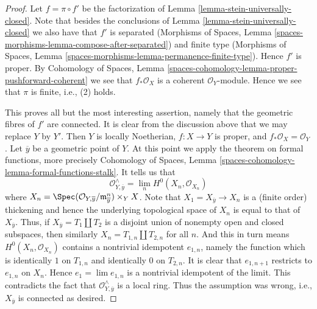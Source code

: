 \begin{proof}
Let $f = \pi \circ f'$ be the factorization of
Lemma \ref{lemma-stein-universally-closed}. Note that besides the
conclusions of Lemma \ref{lemma-stein-universally-closed} we
also have that $f'$ is separated
(Morphisms of Spaces, Lemma
\ref{spaces-morphisms-lemma-compose-after-separated})
and finite type
(Morphisms of Spaces, Lemma
\ref{spaces-morphisms-lemma-permanence-finite-type}).
Hence $f'$ is proper. By
Cohomology of Spaces, Lemma
\ref{spaces-cohomology-lemma-proper-pushforward-coherent}
we see that $f_*\mathcal{O}_X$ is a coherent $\mathcal{O}_Y$-module.
Hence we see that $\pi$ is finite, i.e., (2) holds.

\medskip\noindent
This proves all but the most interesting assertion, namely that
the geometric fibres of $f'$ are connected. It is clear from the
discussion above that we may replace $Y$ by $Y'$. 
Then $Y$ is locally Noetherian,
$f : X \to Y$ is proper, and $f_*\mathcal{O}_X = \mathcal{O}_Y$.
Let $\overline{y}$ be a geometric point of $Y$.
At this point we apply the theorem on formal functions,
more precisely Cohomology of Spaces, Lemma
\ref{spaces-cohomology-lemma-formal-functions-stalk}.
It tells us that
$$
\mathcal{O}^\wedge_{Y, \overline{y}} =
\lim_n H^0(X_n, \mathcal{O}_{X_n})
$$
where $X_n =
\Spec(\mathcal{O}_{Y, \overline{y}}/\mathfrak m_{\overline{y}}^n) \times_Y X$.
Note that $X_1 = X_{\overline{y}} \to X_n$ is a (finite order) thickening
and hence the underlying topological space of $X_n$ is equal to that
of $X_{\overline{y}}$. Thus, if $X_{\overline{y}} = T_1 \amalg T_2$
is a disjoint union of nonempty open and closed subspaces, then similarly
$X_n = T_{1, n} \amalg T_{2, n}$ for all $n$. And this in turn means
$H^0(X_n, \mathcal{O}_{X_n})$ contains a nontrivial idempotent $e_{1, n}$,
namely the function which is identically $1$ on $T_{1, n}$ and
identically $0$ on $T_{2, n}$. It is clear that $e_{1, n + 1}$
restricts to $e_{1, n}$ on $X_n$. Hence $e_1 = \lim e_{1, n}$
is a nontrivial idempotent of the limit. This contradicts the fact
that $\mathcal{O}^\wedge_{Y, \overline{y}}$ is a local ring. Thus the
assumption was wrong, i.e., $X_{\overline{y}}$ is connected
as desired.
\end{proof}

